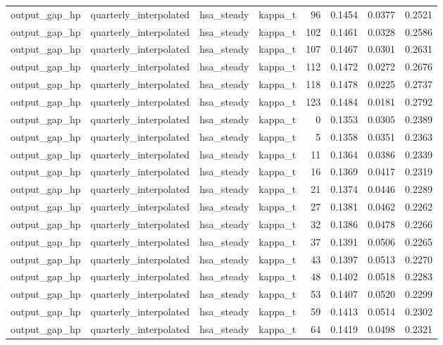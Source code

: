 \begin{tabular}{llllrrrr}
output\_gap\_hp & quarterly\_interpolated & hsa\_steady & kappa\_t & 96 & 0.1454 & 0.0377 & 0.2521 \\
output\_gap\_hp & quarterly\_interpolated & hsa\_steady & kappa\_t & 102 & 0.1461 & 0.0328 & 0.2586 \\
output\_gap\_hp & quarterly\_interpolated & hsa\_steady & kappa\_t & 107 & 0.1467 & 0.0301 & 0.2631 \\
output\_gap\_hp & quarterly\_interpolated & hsa\_steady & kappa\_t & 112 & 0.1472 & 0.0272 & 0.2676 \\
output\_gap\_hp & quarterly\_interpolated & hsa\_steady & kappa\_t & 118 & 0.1478 & 0.0225 & 0.2737 \\
output\_gap\_hp & quarterly\_interpolated & hsa\_steady & kappa\_t & 123 & 0.1484 & 0.0181 & 0.2792 \\
output\_gap\_hp & quarterly\_interpolated & hsa\_steady & kappa\_t & 0 & 0.1353 & 0.0305 & 0.2389 \\
output\_gap\_hp & quarterly\_interpolated & hsa\_steady & kappa\_t & 5 & 0.1358 & 0.0351 & 0.2363 \\
output\_gap\_hp & quarterly\_interpolated & hsa\_steady & kappa\_t & 11 & 0.1364 & 0.0386 & 0.2339 \\
output\_gap\_hp & quarterly\_interpolated & hsa\_steady & kappa\_t & 16 & 0.1369 & 0.0417 & 0.2319 \\
output\_gap\_hp & quarterly\_interpolated & hsa\_steady & kappa\_t & 21 & 0.1374 & 0.0446 & 0.2289 \\
output\_gap\_hp & quarterly\_interpolated & hsa\_steady & kappa\_t & 27 & 0.1381 & 0.0462 & 0.2262 \\
output\_gap\_hp & quarterly\_interpolated & hsa\_steady & kappa\_t & 32 & 0.1386 & 0.0478 & 0.2266 \\
output\_gap\_hp & quarterly\_interpolated & hsa\_steady & kappa\_t & 37 & 0.1391 & 0.0506 & 0.2265 \\
output\_gap\_hp & quarterly\_interpolated & hsa\_steady & kappa\_t & 43 & 0.1397 & 0.0513 & 0.2270 \\
output\_gap\_hp & quarterly\_interpolated & hsa\_steady & kappa\_t & 48 & 0.1402 & 0.0518 & 0.2283 \\
output\_gap\_hp & quarterly\_interpolated & hsa\_steady & kappa\_t & 53 & 0.1407 & 0.0520 & 0.2299 \\
output\_gap\_hp & quarterly\_interpolated & hsa\_steady & kappa\_t & 59 & 0.1413 & 0.0514 & 0.2302 \\
output\_gap\_hp & quarterly\_interpolated & hsa\_steady & kappa\_t & 64 & 0.1419 & 0.0498 & 0.2321 \\

\end{tabular}
